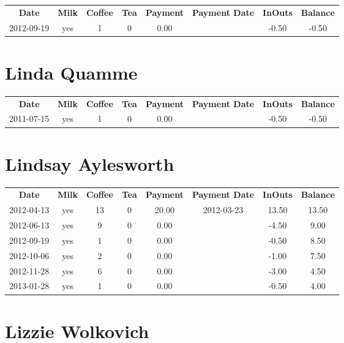 \begin{center}
\begin{tabular}{cccccccc}
\textbf{Date} & \textbf{Milk} & \textbf{Coffee} & \textbf{Tea} & \textbf{Payment} & \textbf{Payment Date} & \textbf{InOuts} & \textbf{Balance} \\
2012-09-19 & yes & 1 & 0 & 0.00 &  & -0.50 & -0.50
\end{tabular}
\end{center}

\section{Linda Quamme}

\begin{center}
\begin{tabular}{cccccccc}
\textbf{Date} & \textbf{Milk} & \textbf{Coffee} & \textbf{Tea} & \textbf{Payment} & \textbf{Payment Date} & \textbf{InOuts} & \textbf{Balance} \\
2011-07-15 & yes & 1 & 0 & 0.00 &  & -0.50 & -0.50
\end{tabular}
\end{center}

\section{Lindsay Aylesworth}

\begin{center}
\begin{tabular}{cccccccc}
\textbf{Date} & \textbf{Milk} & \textbf{Coffee} & \textbf{Tea} & \textbf{Payment} & \textbf{Payment Date} & \textbf{InOuts} & \textbf{Balance} \\
2012-04-13 & yes & 13 & 0 & 20.00 & 2012-03-23 & 13.50 & 13.50\\ 
2012-06-13 & yes &  9 & 0 &  0.00 &  & -4.50 &  9.00\\ 
2012-09-19 & yes &  1 & 0 &  0.00 &  & -0.50 &  8.50\\ 
2012-10-06 & yes &  2 & 0 &  0.00 &  & -1.00 &  7.50\\ 
2012-11-28 & yes &  6 & 0 &  0.00 &  & -3.00 &  4.50\\ 
2013-01-28 & yes &  1 & 0 &  0.00 &  & -0.50 &  4.00
\end{tabular}
\end{center}

\section{Lizzie Wolkovich}

